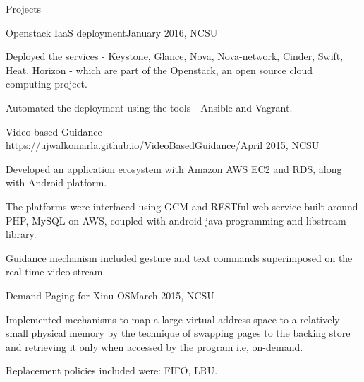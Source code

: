 \documentclass{resume} %
\begin{document}
\begin{rSection}{Projects}
    
    \begin{rSubsectionProject}{Openstack IaaS deployment}{January 2016, NCSU}
    	\item Deployed the services - Keystone, Glance, Nova, Nova-network, Cinder, Swift, Heat, Horizon - which are part of the Openstack, an open source cloud computing project.
        \item Automated the deployment using the tools - Ansible and Vagrant.
    \end{rSubsectionProject}
    
    \begin{rSubsectionProject}{Video-based Guidance - \url{https://ujwalkomarla.github.io/VideoBasedGuidance/}}{April 2015, NCSU}
    	\item Developed an application ecosystem with Amazon AWS EC2 and RDS, along with Android platform.
        \item The platforms were interfaced using GCM and RESTful web service built around PHP, MySQL on AWS, coupled with android java programming and libstream library.
       \item Guidance mechanism included gesture and text commands superimposed on the real-time video stream.
    \end{rSubsectionProject}
    
    \begin{rSubsectionProject}{Demand Paging for Xinu OS}{March 2015, NCSU}
    	\item Implemented mechanisms to map a large virtual address space to a relatively small physical memory by the technique of swapping pages to the backing store and retrieving it only when accessed by the program i.e, on-demand.
    	\item Replacement policies included were: FIFO, LRU.
    \end{rSubsectionProject}
    

\end{rSection}
\end{document}
